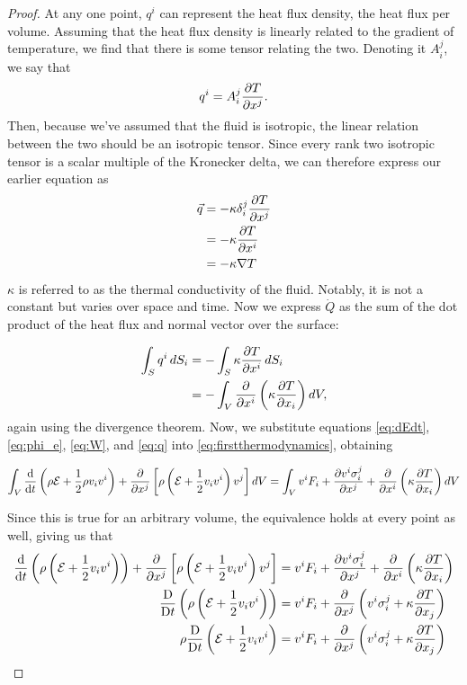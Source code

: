 \documentclass[12 pt]{article}
\theoremstyle{definition}
\newcommand{\Dv}[2]{\frac{\text{D}{#1}}{\text {D}{#2}}}
\begin{document}
\begin{proof}
At any one point, $q^i$ can represent the heat flux density, the heat flux per volume. Assuming that the heat flux density is linearly related to the gradient of temperature, we find that there is some tensor relating the two. Denoting it $A_i^j$, we say that \[q^i = A_i^j  \pdv{T}{x^j}.\] Then, because we've assumed that the fluid is isotropic, the linear relation between the two should be an isotropic tensor. Since every rank two isotropic tensor is a scalar multiple of the Kronecker delta, we can therefore express our earlier equation as
\begin{align*}
\vec{q} &= -\kappa\delta_i^j \pdv{T}{x^j} \\
&= -\kappa\pdv{T}{x^i} \\
&= -\kappa\nabla T
\end{align*} $\kappa$ is referred to as the thermal conductivity of the fluid. Notably, it is not a constant but varies over space and time. Now we express $\dot{Q}$ as the sum of the dot product of the heat flux and normal vector over the surface:

\begin{align}
\int_S q^i\,dS_i &= -\int_S \kappa\pdv{T}{x^i} \,dS_i \nonumber\\
&= -\int_V \pdv{}{x^i}\left(\kappa\pdv{T}{x_i}\right)dV,\label{eq:q}
\end{align}
again using the divergence theorem. Now, we substitute equations \eqref{eq:dEdt}, \eqref{eq:phi_e}, \eqref{eq:W}, and \eqref{eq:q} into \eqref{eq:firstthermodynamics}, obtaining


\[\int_V \dv{}{t}\left(\rho\mathcal{E}+\frac{1}{2}\rho v_iv^i\right) + \pdv{}{x^j}\left[\rho\left(\mathcal{E}+\frac{1}{2}v_iv^i\right)v^j\right]dV = \int_V v^iF_i + \pdv{v^i\sigma^j_i}{x^j} + \pdv{}{x^i}\left(\kappa\pdv{T}{x_i}\right) dV\]

Since this is true for an arbitrary volume, the equivalence holds at every point as well, giving us that
\begin{align*}
    \dv{}{t}\left(\rho\left(\mathcal{E}+\frac{1}{2} v_iv^i\right)\right) + \pdv{}{x^j}\left[\rho\left(\mathcal{E}+\frac{1}{2}v_iv^i\right)v^j\right] &= v^iF_i + \pdv{v^i\sigma^j_i}{x^j} + \pdv{}{x^i}\left(\kappa\pdv{T}{x_i}\right) \\
    \Dv{}{t}\left(\rho\left(\mathcal{E}+\frac{1}{2}v_iv^i\right)\right) &= v^iF_i  + \pdv{}{x^j}\left(v^i\sigma^j_i+\kappa\pdv{T}{x_j}\right)\\
    \rho
    \Dv{}{t}\left(\mathcal{E}+\frac{1}{2}v_iv^i\right) &= v^iF_i  + \pdv{}{x^j}\left(v^i\sigma^j_i+\kappa\pdv{T}{x_j}\right)
\end{align*}

\end{proof}
\end{document}
